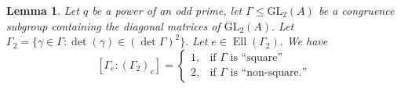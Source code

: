 \documentclass[11pt]{amsart}
\newtheorem{lemma}[theorem]{Lemma}
\theoremstyle{definition}
\numberwithin{equation}{section}
\newcommand{\GL}{\mathrm{GL}} 	%
\newcommand{\bbF}{\mathbb{F}}		%
\begin{document}
		\begin{lemma}\label{l: stabilizer index}
			Let $q$ be a power of an odd prime, let $\Gamma\leq \GL_2(A)$ be a congruence subgroup containing the diagonal matrices of $\GL_2(A).$ 
			Let $\Gamma_2=\{\gamma\in \Gamma:\det(\gamma)\in (\det\Gamma)^2\}.$ 
			Let $e\in \operatorname{Ell}(\Gamma_2).$ We have
			\[[\Gamma_e:(\Gamma_2)_e]=\begin{cases}1, & \text{if }\Gamma\text{ is ``square''}\\
			2, &\text{if }\Gamma\text{ is ``non-square.''}\end{cases}\]
		\end{lemma}
\end{document}
